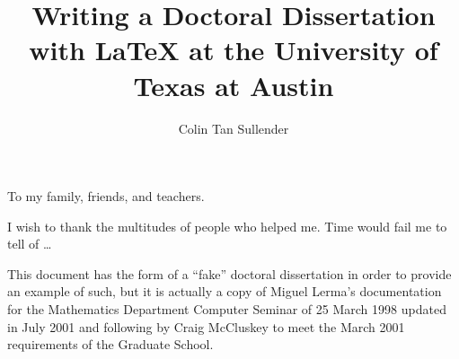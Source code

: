 \documentclass[12pt]{report}
\author{Colin Tan Sullender}
\title{Writing a Doctoral Dissertation with \LaTeX{} at the University of Texas at Austin}
\begin{document}
\copyrightpage      %
\commcertpage       %
\titlepage          %


\begin{dedication}
To my family, friends, and teachers.
\end{dedication}


\begin{acknowledgments}
I wish to thank the multitudes of people who helped me. Time would
fail me to tell of \ldots
\end{acknowledgments}


\utabstract
\indent
This document has the form of a ``fake'' doctoral dissertation in order to provide an example of such, but it is actually a
copy of Miguel Lerma's documentation for the Mathematics Department Computer Seminar of 25 March 1998 updated in July 2001
and following by Craig McCluskey to meet the March 2001 requirements of the Graduate School.


\tableofcontents
\listoftables
\listoffigures






\appendices








\end{document}
